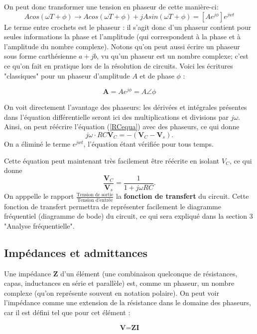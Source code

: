 On peut donc transformer une tension en phaseur de cette manière-ci: $$Acos(\omega T + \phi) \longrightarrow Acos(\omega T + \phi) + jAsin(\omega T + \phi) = [Ae^{j\phi}]e^{jwt}$$
Le terme entre crochets est le phaseur : il s'agit donc d'un phaseur contient pour seules informations la phase et l'amplitude (qui correspondent à la phase et à l'amplitude du nombre complexe). Notons qu'on peut aussi écrire un phaseur sous forme carthésienne $a + jb$, vu qu'un phaseur est un nombre complexe; c'est ce qu'on fait en pratique lors de la résolution de circuits. Voici les écritures "classiques" pour un phaseur d'amplitude $A$ et de phase $\phi$ :

\begin{equation}
\textbf{A} = A e^{j \phi} = A \angle \phi
\end{equation}

On voit directement l'avantage des phaseurs: les dérivées et intégrales présentes dans l'équation différentielle seront ici des multiplications et divisions par $j\omega$. Ainsi, on peut réécrire l'équation (\ref{RCequa}) avec des phaseurs, ce qui donne $$j\omega\cdot RC\textbf{V$_C$} = -(\textbf{V$_C$} - \textbf{V$_s$}).$$
On a éliminé le terme $e^{jwt}$, l'équation étant vérifiée pour tous temps.

Cette équation peut maintenant très facilement être réécrite en isolant $V_C$, ce qui donne $$\frac{\textbf{V$_C$}}{\textbf{V$_s$}} = \frac{1}{1 + j\omega RC}.$$
On apppelle le rapport $\frac{\text{Tension de sortie}}{\text{Tension d'entrée}}$ la \textbf{fonction de transfert} du circuit. Cette fonction de transfert permettra de représenter facilement le diagramme fréquentiel (diagramme de bode) du circuit, ce qui sera expliqué dans la section 3 "Analyse fréquentielle".


\subsection{Impédances et admittances}
Une impédance $\textbf{Z}$ d'un élément (une combinaison quelconque de résistances, capas, inductances en série et parallèle) est, comme un phaseur, un nombre complexe (qu'on représente souvent en notation polaire). On peut voir l'impédance comme une extension de la résistance dans le domaine des phaseurs, car il est défini tel que pour cet élément :

\begin{equation}
\textbf{V} = \textbf{Z} \textbf{I}
\end{equation}

